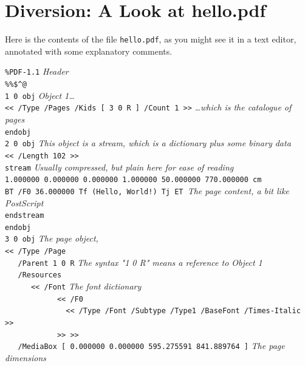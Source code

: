 \documentclass[a4paper]{memoir}
\begin{document}
\section*{Diversion: A Look at hello.pdf}
Here is the contents of the file \texttt{hello.pdf}, as you might see it in a text editor, annotated with some explanatory comments.
\begin{framed}
\noindent\small\verb!%PDF-1.1! \textit{Header}\\
\noindent\small\verb!%%$^@!\\
\noindent\small\verb!1 0 obj! \textit{Object 1\ldots}\\
\noindent\small\verb!<< /Type /Pages /Kids [ 3 0 R ] /Count 1 >>! \textit{\ldots which is the catalogue of pages}\\
\noindent\small\verb!endobj!\\
\noindent\small\verb!2 0 obj! \textit{This object is a stream, which is a dictionary plus some binary data}\\
\noindent\small\verb!<< /Length 102 >>!\\
\noindent\small\verb!stream! \textit{Usually compressed, but plain here for ease of reading}\\
\noindent\small\verb!1.000000 0.000000 0.000000 1.000000 50.000000 770.000000 cm!\\
\noindent\small\verb$BT /F0 36.000000 Tf (Hello, World!) Tj ET $\textit{The page content, a bit like PostScript}\\
\noindent\small\verb!endstream!\\
\noindent\small\verb!endobj!\\
\noindent\small\verb!3 0 obj! \textit{The page object, }\\
\noindent\small\verb!<< /Type /Page!\\
\noindent\small\verb!   /Parent 1 0 R! \textit{The syntax "1 0 R" means a reference to Object 1}\\ 
\noindent\small\verb!   /Resources!\\
\noindent\small\verb!      << /Font! \textit{The font dictionary}\\
\noindent\small\verb!            << /F0!\\
\noindent\small\verb!              << /Type /Font /Subtype /Type1 /BaseFont /Times-Italic >>!\\
\noindent\small\verb!            >> >>!\\
\noindent\small\verb!   /MediaBox [ 0.000000 0.000000 595.275591 841.889764 ]! \textit{The page dimensions}\\

\end{framed}
\end{document}

